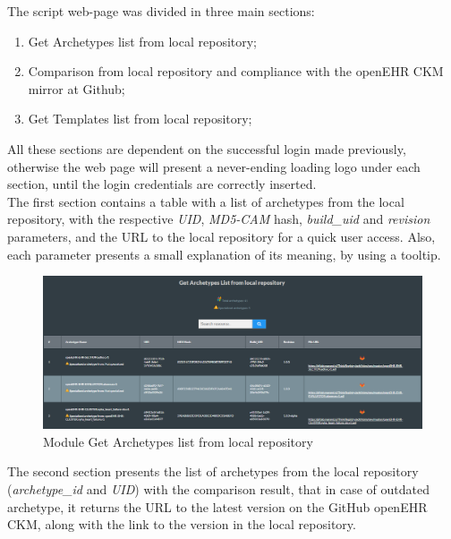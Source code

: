 \documentclass[mim_thesis.tex]{subfiles}
\begin{document}
The script web-page was divided in three main sections: 

\begin{enumerate}[noitemsep]
\item Get Archetypes list from local repository;
\item Comparison from local repository and compliance with the openEHR CKM mirror at Github;
\item Get Templates list from local repository; 
\end{enumerate}

All these sections are dependent on the successful login made previously, otherwise the web page will present a never-ending loading logo under each section, until the login credentials are correctly inserted. \\

The first section contains a table with a list of archetypes from the local repository, with the respective \textit{UID}, \textit{MD5-CAM} hash, \textit{build\_uid} and \textit{revision} parameters, and the URL to the local repository for a quick user access. Also, each parameter presents a small explanation of its meaning, by using a tooltip. 

\begin{figure}[H]
	\centering
    \includegraphics[width=1\textwidth]{img/get_arch_list.PNG}
	\caption{Module Get Archetypes list from local repository }
	\label{fig:get_arch_list}
\end{figure}

The second section presents the list of archetypes from the local repository (\textit{archetype\_id} and \textit{UID}) with the comparison result, that in case of outdated archetype, it returns the URL to the latest version on the GitHub openEHR CKM, along with the link to the version in the local repository. 
\end{document}
